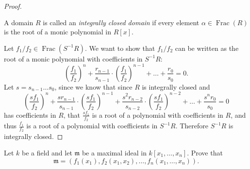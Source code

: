 \documentclass{article}
\newenvironment{problem}[2][Problem]{\begin{trivlist}
\item[\hskip \labelsep {\bfseries #1}\hskip \labelsep {\bfseries #2.}]}{\end{trivlist}}
\newenvironment{definition}[1][Definition.]{
  \begin{trivlist} \item[\hskip \labelsep {\bfseries #1}]
}{\end{trivlist}}
\newcommand{\paren}[1]{\left( #1 \right)}
\begin{document}
\begin{proof} ~
  \begin{definition}
    A domain $R$ is called an \textit{integrally closed domain} if every element
    $\alpha \in \operatorname{Frac}(R)$ is the root of a monic polynomial in
    $R[x]$.
  \end{definition}
  Let $f_1/f_2 \in \operatorname{Frac}(S^{-1}R)$. We want to show that $f_1/f_2$
  can be written as the root of a monic polynomial with coefficients in $S^{-1}R$: \[
    \paren{\frac{f_1}{f_2}}^n
    + \frac{r_{n-1}}{s_{n-1}}\cdot\paren{\frac{f_1}{f_2}}^{n-1}
    + \hdots
    + \frac{r_0}{s_0}
    = 0.
  \] Let $s = s_{n-1} \hdots s_0$, since we know that since $R$ is integrally closed and \[
    \paren{\frac{sf_1}{f_2}}^n
    + \frac{s r_{n-1}}{s_{n-1}}\cdot\paren{\frac{sf_1}{f_2}}^{n-1}
    + \frac{s^2 r_{n-2}}{s_{n-2}}\cdot\paren{\frac{sf_1}{f_2}}^{n-2}
    + \hdots
    + \frac{s^n r_0}{s_0}
    = 0
  \]  has coefficients in $R$, that $\frac{sf_1}{f_2}$ is a root of a polynomial
  with coefficients in $R$, and thus $\frac{f_1}{f_2}$ is a root of a polynomial
  with coefficients in $S^{-1}R$. Therefore $S^{-1}R$ is integrally closed.
\end{proof}
\pagebreak
\begin{problem}{10.39 (Rotman)} %
  Let $k$ be a field and let $\mathfrak m$ be a maximal ideal in
  $k[x_1, \hdots, x_n]$. Prove that \[
    \mathfrak m = (f_1(x_1), f_2(x_1, x_2), \hdots, f_n(x_1, \hdots, x_n)).
  \]
\end{problem}
\end{document}
